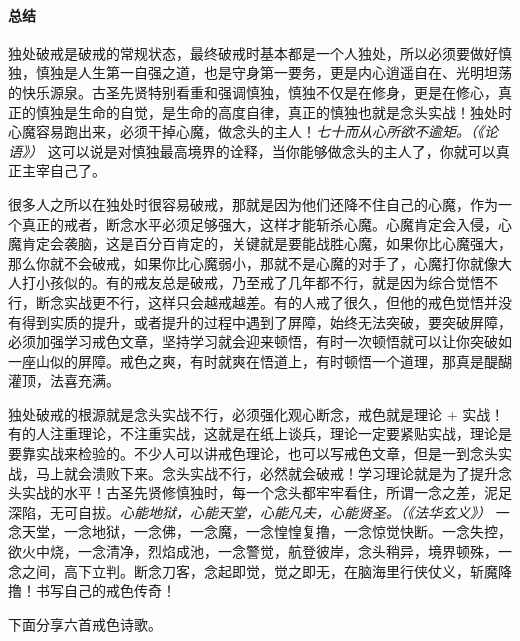 \paragraph*{总结}

独处破戒是破戒的常规状态，最终破戒时基本都是一个人独处，所以必须要做好慎独，慎独是人生第一自强之道，也是守身第一要务，更是内心逍遥自在、光明坦荡的快乐源泉。古圣先贤特别看重和强调慎独，慎独不仅是在修身，更是在修心，真正的慎独是生命的自觉，是生命的高度自律，真正的慎独也就是念头实战！独处时心魔容易跑出来，必须干掉心魔，做念头的主人！\textit{七十而从心所欲不逾矩。（《论语》）} 这可以说是对慎独最高境界的诠释，当你能够做念头的主人了，你就可以真正主宰自己了。

很多人之所以在独处时很容易破戒，那就是因为他们还降不住自己的心魔，作为一个真正的戒者，断念水平必须足够强大，这样才能斩杀心魔。心魔肯定会入侵，心魔肯定会袭脑，这是百分百肯定的，关键就是要能战胜心魔，如果你比心魔强大，那么你就不会破戒，如果你比心魔弱小，那就不是心魔的对手了，心魔打你就像大人打小孩似的。有的戒友总是破戒，乃至戒了几年都不行，就是因为综合觉悟不行，断念实战更不行，这样只会越戒越差。有的人戒了很久，但他的戒色觉悟并没有得到实质的提升，或者提升的过程中遇到了屏障，始终无法突破，要突破屏障，必须加强学习戒色文章，坚持学习就会迎来顿悟，有时一次顿悟就可以让你突破如一座山似的屏障。戒色之爽，有时就爽在悟道上，有时顿悟一个道理，那真是醍醐灌顶，法喜充满。

独处破戒的根源就是念头实战不行，必须强化观心断念，戒色就是理论 + 实战！有的人注重理论，不注重实战，这就是在纸上谈兵，理论一定要紧贴实战，理论是要靠实战来检验的。不少人可以讲戒色理论，也可以写戒色文章，但是一到念头实战，马上就会溃败下来。念头实战不行，必然就会破戒！学习理论就是为了提升念头实战的水平！古圣先贤修慎独时，每一个念头都牢牢看住，所谓一念之差，泥足深陷，无可自拔。\textit{心能地狱，心能天堂，心能凡夫，心能贤圣。（《法华玄义》）} 一念天堂，一念地狱，一念佛，一念魔，一念惶惶复撸，一念惊觉快断。一念失控，欲火中烧，一念清净，烈焰成池，一念警觉，航登彼岸，念头稍异，境界顿殊，一念之间，高下立判。断念刀客，念起即觉，觉之即无，在脑海里行侠仗义，斩魔降撸！书写自己的戒色传奇！

下面分享六首戒色诗歌。

